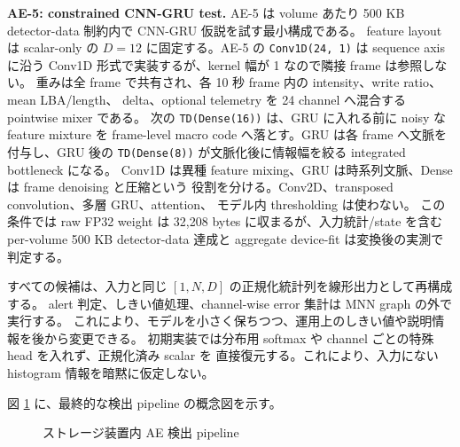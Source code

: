 \noindent\textbf{AE-5: constrained CNN-GRU test.}
AE-5 は volume あたり 500 KB detector-data 制約内で CNN-GRU 仮説を試す最小構成である。
feature layout は scalar-only の $D=12$ に固定する。AE-5 の \texttt{Conv1D(24, 1)} は
sequence axis に沿う Conv1D 形式で実装するが、kernel 幅が 1 なので隣接 frame は参照しない。
重みは全 frame で共有され、各 10 秒 frame 内の intensity、write ratio、mean LBA/length、
delta、optional telemetry を 24 channel へ混合する pointwise mixer である。
次の \texttt{TD(Dense(16))} は、GRU に入れる前に noisy な feature mixture を
frame-level macro code へ落とす。GRU は各 frame へ文脈を付与し、GRU 後の
\texttt{TD(Dense(8))} が文脈化後に情報幅を絞る integrated bottleneck になる。
Conv1D は異種 feature mixing、GRU は時系列文脈、Dense は frame denoising と圧縮という
役割を分ける。Conv2D、transposed convolution、多層 GRU、attention、
モデル内 thresholding は使わない。
この条件では raw FP32 weight は 32,208 bytes に収まるが、入力統計/state を含む per-volume
500 KB detector-data 達成と aggregate device-fit は変換後の実測で判定する。

すべての候補は、入力と同じ $[1,N,D]$ の正規化統計列を線形出力として再構成する。
alert 判定、しきい値処理、channel-wise error 集計は MNN graph の外で実行する。
これにより、モデルを小さく保ちつつ、運用上のしきい値や説明情報を後から変更できる。
初期実装では分布用 softmax や channel ごとの特殊 head を入れず、正規化済み scalar を
直接復元する。これにより、入力にない histogram 情報を暗黙に仮定しない。

図 \ref{fig:pipeline} に、最終的な検出 pipeline の概念図を示す。

\begin{figure}[tb]
  \centering
  \caption{ストレージ装置内 AE 検出 pipeline}
  \label{fig:pipeline}
\end{figure}

